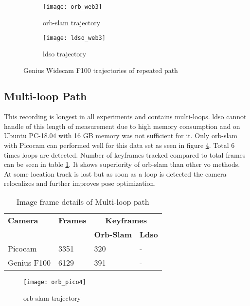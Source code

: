 \begin{figure}[H]
	\begin{subfigure}{.5\textwidth}
		\centering
		\texttt{[image: orb\_web3]}
		\caption{\acrshort{orb}-\acrshort{slam} trajectory}
		\label{fig:orb_web3}
	\end{subfigure}%
	\begin{subfigure}{.5\textwidth}
		\centering
		\texttt{[image: ldso\_web3]}
		\caption{\acrshort{ldso} trajectory}
		\label{fig:ldso_web3}
	\end{subfigure}
	\caption{Genius Widecam F100 trajectories of repeated path}
	\label{fig:Web3}
\end{figure}

\subsection{Multi-loop Path}
This recording is longest in all experiments and contains multi-loops. \acrshort{ldso} cannot handle of this length of measurement due to high memory consumption and on Ubuntu PC-18.04 with 16 GB memory was not sufficient for it. Only \acrshort{orb}-\acrshort{slam} with Picocam can performed well for this data set as seen in figure \ref{fig:orb_pico4}. Total 6 times loops are detected. Number of keyframes tracked compared to total frames can be seen in table \ref{table:multi-loop}. It shows superiority of \acrshort{orb}-\acrshort{slam} than other \acrshort{vo} methods. At some location track is lost but as soon as a loop is detected the camera relocalizes and further improves pose optimization. 
\begin{table}[H]
	\centering
	\renewcommand{\arraystretch}{1.5}
	\begin{tabular}{ l| l| l |l }
		\textbf{Camera} & \textbf{Frames} & \multicolumn{2}{c}{\textbf{Keyframes}}  \\    
		&      & \textbf{Orb-Slam}  & \textbf{Ldso}  \\
		\hline
		Picocam & 3351 & 320   & - \\ 
		\hline
		Genius F100 & 6129  &  391  & - \\ 
	\end{tabular}
	\caption{Image frame details of Multi-loop path}
	\label{table:multi-loop}
\end{table}

\begin{figure}[H]
	\centering
	\texttt{[image: orb\_pico4]}
	\caption{\acrshort{orb}-\acrshort{slam} trajectory}
	\label{fig:orb_pico4}
\end{figure}

